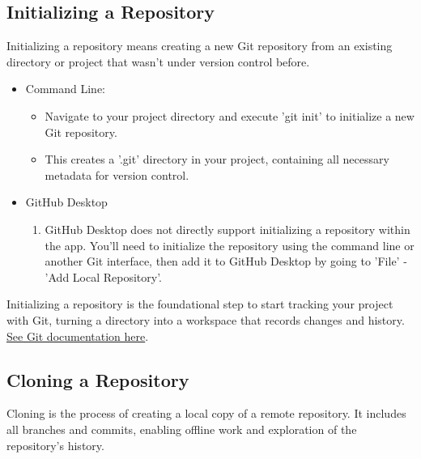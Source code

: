 \documentclass[10pt,twocolumn]{article}
\begin{document}
\subsection{Initializing a Repository}

Initializing a repository means creating a new Git repository from an existing directory or project that wasn't under version control before.

\begin{itemize}
    \item Command Line: 
    \begin{itemize}
        \item  Navigate to your project directory and execute 'git init' to initialize a new Git repository.
        \item This creates a '.git' directory in your project, containing all necessary metadata for version control.
    \end{itemize}
    \item GitHub Desktop
    \begin{enumerate}
        \item GitHub Desktop does not directly support initializing a repository within the app. You'll need to initialize the repository using the command line or another Git interface, then add it to GitHub Desktop by going to 'File' - 'Add Local Repository'.
    \end{enumerate}
    
\end{itemize}

Initializing a repository is the foundational step to start tracking your project with Git, turning a directory into a workspace that records changes and history. \hyperlink{https://git-scm.com/docs/git-init}{See Git documentation here}. \cite{GitInitDocumentation}\cite{GitGuidesInit}

\subsection{Cloning a Repository}

Cloning is the process of creating a local copy of a remote repository. It includes all branches and commits, enabling offline work and exploration of the repository's history.
\end{document}
